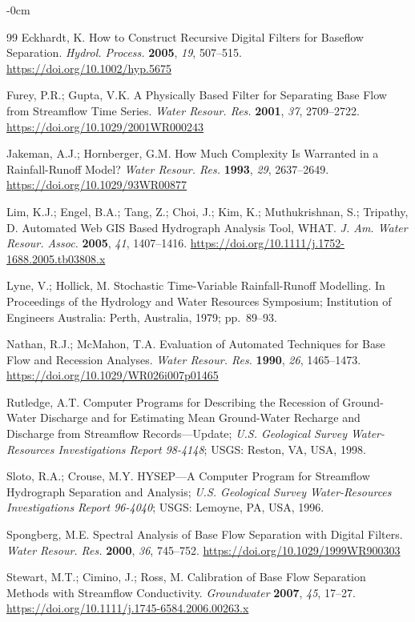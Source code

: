 \documentclass[hydrology,article,submit,pdftex,moreauthors]{Definitions/mdpi}
\begin{document}
\begin{adjustwidth}{-\extralength}{0cm}
\begin{thebibliography}{99}
Eckhardt, K. How to Construct Recursive Digital Filters for Baseflow Separation. \textit{Hydrol. Process.} \textbf{2005}, \textit{19}, 507--515. \url{https://doi.org/10.1002/hyp.5675}

Furey, P.R.; Gupta, V.K. A Physically Based Filter for Separating Base Flow from Streamflow Time Series. \textit{Water Resour. Res.} \textbf{2001}, \textit{37}, 2709--2722. \url{https://doi.org/10.1029/2001WR000243}

Jakeman, A.J.; Hornberger, G.M. How Much Complexity Is Warranted in a Rainfall-Runoff Model? \textit{Water Resour. Res.} \textbf{1993}, \textit{29}, 2637--2649. \url{https://doi.org/10.1029/93WR00877}

Lim, K.J.; Engel, B.A.; Tang, Z.; Choi, J.; Kim, K.; Muthukrishnan, S.; Tripathy, D. Automated Web GIS Based Hydrograph Analysis Tool, WHAT. \textit{J. Am. Water Resour. Assoc.} \textbf{2005}, \textit{41}, 1407--1416. \url{https://doi.org/10.1111/j.1752-1688.2005.tb03808.x}

Lyne, V.; Hollick, M. Stochastic Time-Variable Rainfall-Runoff Modelling. In Proceedings of the Hydrology and Water Resources Symposium; Institution of Engineers Australia: Perth, Australia, 1979; pp.~89--93.

Nathan, R.J.; McMahon, T.A. Evaluation of Automated Techniques for Base Flow and Recession Analyses. \textit{Water Resour. Res.} \textbf{1990}, \textit{26}, 1465--1473. \url{https://doi.org/10.1029/WR026i007p01465}

Rutledge, A.T. Computer Programs for Describing the Recession of Ground-Water Discharge and for Estimating Mean Ground-Water Recharge and Discharge from Streamflow Records---Update; \textit{U.S. Geological Survey Water-Resources Investigations Report 98-4148}; USGS: Reston, VA, USA, 1998.

Sloto, R.A.; Crouse, M.Y. HYSEP---A Computer Program for Streamflow Hydrograph Separation and Analysis; \textit{U.S. Geological Survey Water-Resources Investigations Report 96-4040}; USGS: Lemoyne, PA, USA, 1996.

Spongberg, M.E. Spectral Analysis of Base Flow Separation with Digital Filters. \textit{Water Resour. Res.} \textbf{2000}, \textit{36}, 745--752. \url{https://doi.org/10.1029/1999WR900303}

Stewart, M.T.; Cimino, J.; Ross, M. Calibration of Base Flow Separation Methods with Streamflow Conductivity. \textit{Groundwater} \textbf{2007}, \textit{45}, 17--27. \url{https://doi.org/10.1111/j.1745-6584.2006.00263.x}


\end{thebibliography}
\end{adjustwidth}
\end{document}
